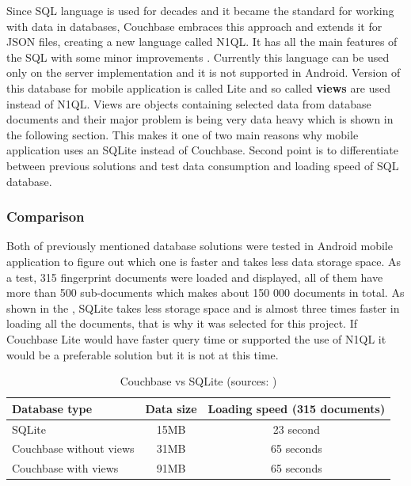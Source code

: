 Since SQL language is used for decades and it became the standard for working with data in databases, Couchbase embraces this approach and extends it for JSON files, creating a new language called N1QL. It has all the main features of the SQL with some minor improvements \cite{WINQL}. Currently this language can be used only on the server implementation and it is not supported in Android. Version of this database for mobile application is called Lite and so called \textbf{views} are used instead of N1QL. Views are objects containing selected data from database documents and their major problem is being very data heavy which is shown in the following section. This makes it one of two main reasons why mobile application uses an SQLite instead of Couchbase. Second point is to differentiate between previous solutions and test data consumption and loading speed of SQL database.

\subsubsection{Comparison}\label{subsubsec:Comparison}
Both of previously mentioned database solutions were tested in Android mobile application to figure out which one is faster and takes less data storage space. As a test, 315 fingerprint documents were loaded and displayed, all of them have more than 500 sub-documents which makes about 150 000 documents in total. As shown in the , SQLite takes less storage space and is almost three times faster in loading all the documents, that is why it was selected for this project. If Couchbase Lite would have faster query time or supported the use of N1QL it would be a preferable solution but it is not at this time.

\begin{table}[h]
	\begin{center}
		\scriptsize
		\begin{tabular}{| l | c | c |}
			\hline
			Database type & Data size & Loading speed (315 documents) \\ \hline
			SQLite & 15MB & 23 second \\ \hline
			Couchbase without views & 31MB & 65 seconds \\ \hline
			Couchbase with views & 91MB & 65 seconds \\ \hline
		\end{tabular}
		\caption{Couchbase vs SQLite (sources: \cite{LGWSP, LGWST, HW2, PM600, AZW3})}
		\label{tab3}
	\end{center}
\end{table}

